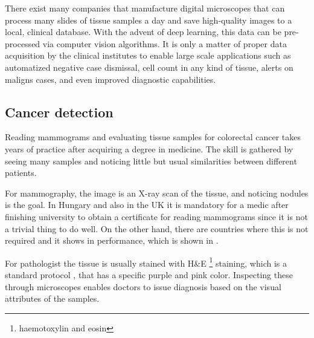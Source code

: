 \documentclass[a4paper,12pt]{article}
\begin{document}
\vspace{4mm}

\par There exist many companies that manufacture digital microscopes that can process many slides of tissue samples a day and save high-quality images to a local, clinical database. With the advent of deep learning, this data can be pre-processed via computer vision algorithms. It is only a matter of proper data acquisition by the clinical institutes to enable large scale applications such as automatized negative case dismissal, cell count in any kind of tissue, alerts on maligns cases, and even improved diagnostic capabilities.

\vspace{7mm}

\subsection{Cancer detection}

\vspace{7mm}

\par Reading mammograms and evaluating tissue samples for colorectal cancer takes years of practice after acquiring a degree in medicine. The skill is gathered by seeing many samples and noticing little but usual similarities between different patients. 

\vspace{4mm}

\par For mammography, the image is an X-ray scan of the tissue, and noticing nodules is the goal. In Hungary and also in the UK it is mandatory for a medic after finishing university to obtain a certificate for reading mammograms since it is not a trivial thing to do well. On the other hand, there are countries where this is not required and it shows in performance, which is shown in \cite{mckinney2020international}.

\vspace{4mm}

\par For pathologist the tissue is usually stained with H\&E \footnote{haemotoxylin and eosin} staining, which is a standard protocol \cite{fischer2008hematoxylin}, that has a specific purple and pink color. Inspecting these through microscopes enables doctors to issue diagnosis based on the visual attributes of the samples.

\vspace{4mm}
\end{document}
